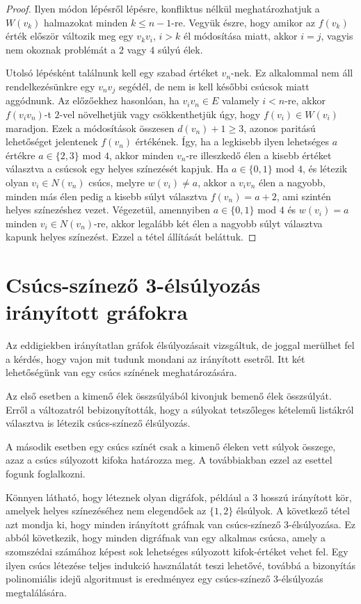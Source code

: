 \documentclass[12pt, a4paper]{report}
\theoremstyle{remark}
\theoremstyle{definition}
\begin{document}
\begin{proof}
Ilyen módon lépésről lépésre, konfliktus nélkül meghatározhatjuk a $W(v_k)$ halmazokat minden $k \leq n - 1$-re. Vegyük észre, hogy amikor az $f(v_k)$ érték először változik meg egy $v_k v_i$, $i > k$ él módosítása miatt, akkor $i = j$, vagyis nem okoznak problémát a $2$ vagy $4$ súlyú élek.

Utolsó lépésként találnunk kell egy szabad értéket $v_n$-nek. Ez alkalommal nem áll rendelkezésünkre egy $v_n v_j$ segédél, de nem is kell későbbi csúcsok miatt aggódnunk. Az előzőekhez hasonlóan, ha $v_i v_n \in E$ valamely $i < n$-re, akkor $f(v_i v_n)$-t $2$-vel növelhetjük vagy csökkenthetjük úgy, hogy $f(v_i) \in W(v_i)$ maradjon. Ezek a módosítások összesen $d(v_n) +1 \geq 3$, azonos paritású lehetőséget jelentenek $f(v_n)$ értékének. Így, ha a legkisebb ilyen lehetséges $a$ értékre $a \in \lbrace 2, 3 \rbrace$ mod $4$, akkor minden $v_n$-re illeszkedő élen a kisebb értéket választva a csúcsok egy helyes színezését kapjuk. Ha $a \in \lbrace 0, 1 \rbrace$ mod $4$, és létezik olyan $v_i \in N(v_n)$ csúcs, melyre $w(v_i) \neq a$, akkor a $v_i v_n$ élen a nagyobb, minden más élen pedig a kisebb súlyt választva $f(v_n) = a + 2$, ami szintén helyes színezéshez vezet. Végezetül, amennyiben $a \in \lbrace 0, 1 \rbrace$ mod $4$ és $w(v_i) = a$ minden $v_i \in N(v_n)$-re, akkor legalább két élen a nagyobb súlyt választva kapunk helyes színezést. Ezzel a tétel állítását beláttuk.
\end{proof}

\section{Csúcs-színező 3-élsúlyozás irányított gráfokra}
Az eddigiekben irányítatlan gráfok élsúlyozásait vizsgáltuk, de joggal merülhet fel a kérdés, hogy vajon mit tudunk mondani az irányított esetről. Itt két lehetőségünk van egy csúcs színének meghatározására. 

Az első esetben a kimenő élek összsúlyából kivonjuk bemenő élek összsúlyát. Erről a változatról \citeauthor{Bartnicki2009} \cite{Bartnicki2009} bebizonyították, hogy a súlyokat tetszőleges kételemű listákról választva is létezik csúcs-színező élsúlyozás.

A második esetben egy csúcs színét csak a kimenő éleken vett súlyok összege, azaz a csúcs súlyozott kifoka határozza meg. A továbbiakban ezzel az esettel fogunk foglalkozni.

Könnyen látható, hogy léteznek olyan digráfok, például a $3$ hosszú irányított kör, amelyek helyes színezéséhez nem elegendőek az $\lbrace 1, 2 \rbrace$ élsúlyok. A következő tétel azt mondja ki, hogy minden irányított gráfnak van csúcs-színező 3-élsúlyozása. Ez abból következik, hogy minden digráfnak van egy alkalmas csúcsa, amely a szomszédai számához képest sok lehetséges súlyozott kifok-értéket vehet fel. Egy ilyen csúcs létezése teljes indukció használatát teszi lehetővé, továbbá a bizonyítás polinomiális idejű algoritmust is eredményez egy csúcs-színező 3-élsúlyozás megtalálására.
\end{document}
